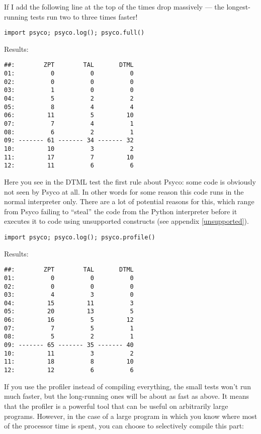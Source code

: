 \documentclass{manual}
\begin{document}
If I add the following line at the top of  the times drop massively --- the longest-running tests run two to three times faster!

\begin{verbatim}
import psyco; psyco.log(); psyco.full()
\end{verbatim}

Results:

\begin{verbatim}
##:        ZPT        TAL       DTML
01:          0          0          0
02:          0          0          0
03:          1          0          0
04:          5          2          2
05:          8          4          4
06:         11          5         10
07:          7          4          1
08:          6          2          1
09: ------- 61 ------- 34 ------- 32
10:         10          3          2
11:         17          7         10
12:         11          6          6
\end{verbatim}

Here you see in the DTML test the first rule about Psyco: some code is obviously not seen by Psyco at all.  In other words for some reason this code runs in the normal interpreter only.  There are a lot of potential reasons for this, which range from Psyco failing to ``steal'' the code from the Python interpreter before it executes it to code using unsupported constructs (see appendix \ref{unsupported}).

\begin{verbatim}
import psyco; psyco.log(); psyco.profile()
\end{verbatim}

Results:

\begin{verbatim}
##:        ZPT        TAL       DTML
01:          0          0          0
02:          0          0          0
03:          4          3          0
04:         15         11          3
05:         20         13          5
06:         16          5         12
07:          7          5          1
08:          5          2          1
09: ------- 65 ------- 35 ------- 40
10:         11          3          2
11:         18          8         10
12:         12          6          6
\end{verbatim}

If you use the profiler instead of compiling everything, the small tests won't run much faster, but the long-running ones will be about as fast as above.  It means that the profiler is a powerful tool that can be useful on arbitrarily large programs.  However, in the case of a large program in which you know where most of the processor time is spent, you can choose to selectively compile this part:
\end{document}
